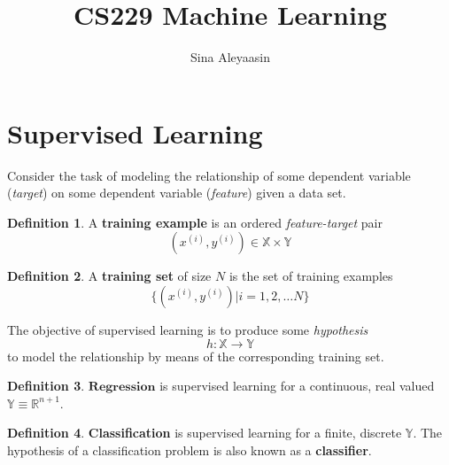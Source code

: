 \documentclass{article}
\title{CS229 Machine Learning}
\author{Sina Aleyaasin}
\theoremstyle{definition}
\newtheorem{definition}{Definition}[section]
\theoremstyle{remark}
\begin{document}
\maketitle

\section{Supervised Learning}

Consider the task of modeling the relationship of some dependent variable (\textit{target}) on some dependent variable (\textit{feature}) given a data set.
\begin{definition}
A \textbf{training example} is an ordered \textit{feature-target} pair 
    \begin{equation}
    (x^{(i)}, y^{(i)}) \in \mathbb{X} \times \mathbb{Y}
    \end{equation}
\end{definition}
\begin{definition}
A \textbf{training set} of size $N$ is the set of training examples 
\begin{equation}
    \{(x^{(i)}, y^{(i)})| i = 1, 2, \dots N\}
\end{equation}
\end{definition}
The objective of supervised learning is to produce some \textit{hypothesis} 
\begin{equation}
    h : \mathbb{X} \rightarrow \mathbb{Y}
\end{equation}
to model the relationship by means of the corresponding training set.
\begin{definition}
$\mathbf{Regression}$ is supervised learning for a continuous, real valued $\mathbb{Y} \equiv \mathbb{R}^{n+1}$.
\end{definition}
\begin{definition}
\textbf{Classification} is supervised learning for a finite, discrete $\mathbb{Y}$. The hypothesis of a classification problem is also known as a \textbf{classifier}.
\end{definition}
\end{document}
